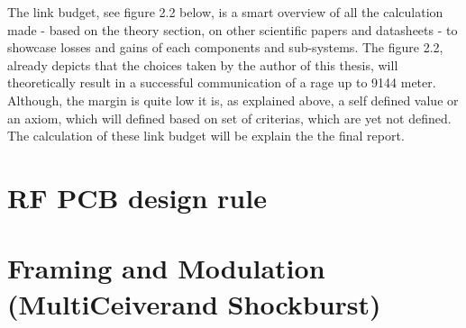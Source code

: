 The link budget, see figure 2.2 below, is a smart overview of all the calculation made - based on the theory section, on other scientific papers and datasheets - to showcase losses and gains of each components and sub-systems. The figure 2.2, already depicts that the choices taken by the author of this thesis, will theoretically result in a successful communication of a rage up to 9144 meter. Although, the margin is quite low it is, as explained above, a self defined value or an axiom, which will defined based on set of criterias, which are yet not defined. The calculation of these link budget will be explain the the final report. 

\section{RF PCB design rule}

\section{Framing and Modulation (MultiCeiver\texttrademark and Shockburst\texttrademark)}




